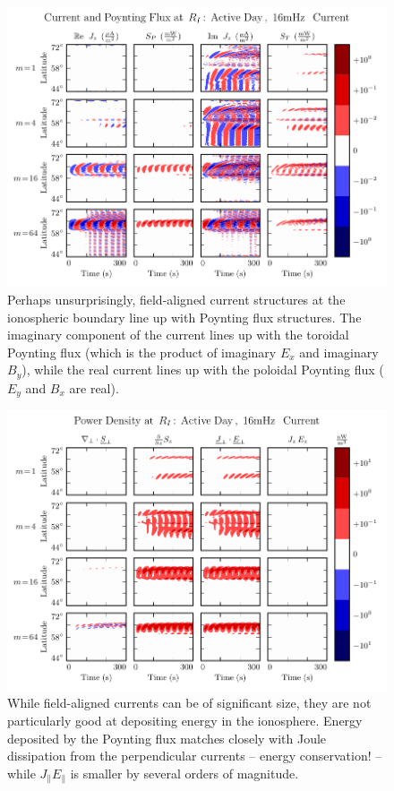\begin{figure}[!htb]
    \centering
    \includegraphics[width=\textwidth]{figures/current_poynting_flux.pdf}
    \caption[Current and Poynting Flux at the Ionosphere]{
      Perhaps unsurprisingly, field-aligned current structures at the ionospheric boundary line up with Poynting flux structures. The imaginary component of the current lines up with the toroidal Poynting flux (which is the product of imaginary $E_x$ and imaginary $B_y$), while the real current lines up with the poloidal Poynting flux ($E_y$ and $B_x$ are real). 
    }
    \label{fig_current_poynting_flux}
\end{figure}



\begin{figure}[!htb]
    \centering
    \includegraphics[width=\textwidth]{figures/power_density.pdf}
    \caption[Power Density at the Ionosphere]{
      While field-aligned currents can be of significant size, they are not particularly good at depositing energy in the ionosphere. Energy deposited by the Poynting flux matches closely with Joule dissipation from the perpendicular currents -- energy conservation! -- while $J_\parallel E_\parallel$ is smaller by several orders of magnitude. 
    }
    \label{fig_power_density}
\end{figure}

